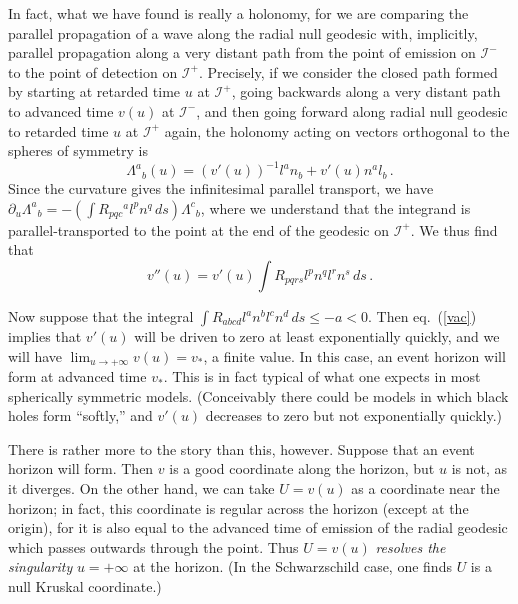 \documentclass[
%
draft    %
,numberedheadings 
,bibliocites
  ]
  {aipproc}
\newcommand{\scrif}{{{\mathscr I}^{+}}}
\newcommand{\scrip}{{{\mathscr I}^{-}}}
\newcommand{\vv}{{v}}
\begin{document}
In fact, what we have found is really a holonomy, for we are comparing the parallel propagation of a wave along the radial null geodesic with, implicitly, parallel propagation along a very distant path from the point of emission on $\scrip$ to the point of detection on $\scrif$.  Precisely, if we consider the closed path formed by starting at retarded time $u$ at $\scrif$, going backwards along a very distant path to advanced time $\vv (u)$ at $\scrip$, and then going forward along radial null geodesic to retarded time $u$ at $\scrif$ again, the holonomy acting on vectors orthogonal to the spheres of symmetry is
\begin{equation}
  \Lambda ^a{}_b(u)=(\vv ' (u))^{-1}  l^an_b+ \vv '(u) n^al_b\, .
\end{equation}
Since the curvature gives the infinitesimal parallel transport, we have $\partial _u\Lambda ^a{}_b=-(\int R_{pqc}{}^a l^pn^q\, ds)\Lambda ^c{}_b$,
where we understand that the integrand is 
parallel-transported to the point at the end of the geodesic on $\scrif$.  We thus find that
\begin{equation}\label{vac}
 \vv ''(u)=\vv '(u) \int R_{pqrs}l^pn^ql^rn^s{}\, ds\, .
\end{equation}

Now suppose that the integral $\int R_{abcd}l^an^bl^cn^d\, ds\leq -a<0$.  Then eq.~(\ref{vac}) implies that $\vv '(u)$ will be driven to zero at least exponentially quickly, and we will have $\lim _{u\to +\infty} \vv (u)=v_*$, a finite value.  In this case, an event horizon will form at advanced time $v_*$.  This is in fact typical of what one expects in most spherically symmetric models.  (Conceivably  there could be models in which black holes form ``softly,'' and $\vv '(u)$ decreases to zero but not exponentially quickly.)

There is rather more to the story than this, however.  Suppose that an event horizon will form.  Then $v$ is a good coordinate along the horizon, but $u$ is not, as it diverges.  On the other hand, we can take $U=\vv (u)$ as a coordinate near the horizon; in fact, this coordinate is regular across the horizon (except at the origin), for it is also equal to the advanced time of emission of the radial geodesic which passes outwards through the point.  Thus $U=\vv (u)$ {\em resolves the singularity} $u=+\infty$ at the horizon.  (In the Schwarzschild case, one finds $U$ is a null Kruskal coordinate.)
\end{document}
